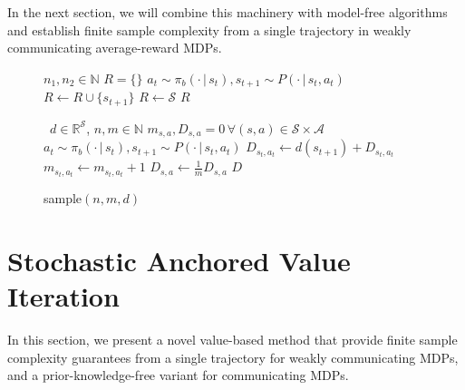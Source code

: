 \documentclass{article}
\theoremstyle{definition}
\theoremstyle{remark}
\newcommand{\real}{\mathbb{R}}
\newcommand{\cA}{\mathcal{A}}
\newcommand{\cS}{\mathcal{S}}
\begin{document}
In the next section, we will combine this machinery with model-free algorithms and establish finite sample complexity from a single trajectory in weakly communicating average-reward MDPs.
\begin{figure}[H]
    \begin{minipage}[t]{0.48\textwidth}
\begin{algorithm}[H]
   \caption{\mbox{\sc recur}$(n_1,n_2)$}
   \label{alg:rec}
\begin{algorithmic}
   $n_1, n_2 \in \mathbb{N}$
   $R =\{\}$
    \State $a_t \sim \pi_b(\cdot \,|\, s_{t}), s_{t+1} \sim P(\cdot \,|\, s_t,a_t)$
    \State $R \gets R \cup \{s_{t+1}\}$
    \EndIf
    \EndFor
      \State $R \gets \cS$
    \EndIf
  $R$
\end{algorithmic}
\end{algorithm}
 \end{minipage}
    \hfill
    \begin{minipage}[t]{0.48\textwidth}
    \begin{algorithm}[H]
   \caption{\mbox{\sc sample}$( n,  m, d)$}
   \label{alg:sam_1}
\begin{algorithmic}
  \ $d \in \real^{\cS}$, $n, m \in \mathbb{N}$
   $m_{s,a}, D_{s,a} =0\, \forall (s,a) \in \cS \times \cA $
     \State $a_{t} \sim \pi_b(\cdot \,|\, s_{t}), s_{t+1} \sim P(\cdot \,|\, s_t,a_t)$
   \State $D_{s_t,a_t} \gets d(s_{t+1}) + D_{s_t,a_t}$
   \EndIf
       \State $m_{s_t,a_t} \gets m_{s_t,a_t}+1$
  \EndFor
  \For{$(s,a) \in \cS \times \cA$}
  \State $D_{s,a} \gets \frac{1}{m}D_{s,a} $
  \EndFor
  $D$
\end{algorithmic}
\end{algorithm}
 \end{minipage}
\end{figure}
\fi 

\section{Stochastic Anchored Value Iteration}\label{sec:savi}
In this section, we present a novel value-based method that provide finite sample complexity guarantees from a single trajectory for weakly communicating MDPs, and a prior-knowledge-free variant for communicating MDPs.
\end{document}

